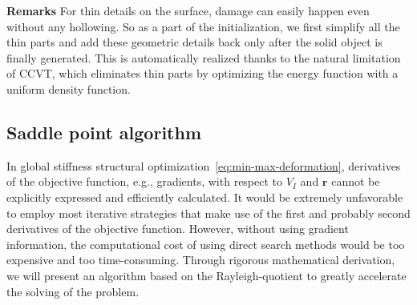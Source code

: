 

\noindent\textbf{Remarks}
For thin details on the surface, damage can easily happen even without any hollowing.
So as a part of the initialization, we first simplify all the thin parts and add these geometric details back only after the solid object is finally generated.
This is automatically realized thanks to the natural limitation of CCVT, which eliminates thin parts by optimizing the energy function with a uniform density function.



\subsection{Saddle point algorithm}
\label{subsec:opt-algorithm}





In global stiffness structural optimization~\eqref{eq:min-max-deformation}, derivatives of the objective function, e.g., gradients, with respect to $V_I$ and $\mathbf{r}$ cannot be explicitly expressed and efficiently calculated.
%
It would be extremely unfavorable to employ most iterative strategies that make use of the first and probably second derivatives of the objective function.
However, without using gradient information, the computational cost of using direct search methods would be too expensive and too time-consuming.
%
Through rigorous mathematical derivation, we will present an algorithm based on the Rayleigh-quotient to greatly accelerate the solving of the problem.





